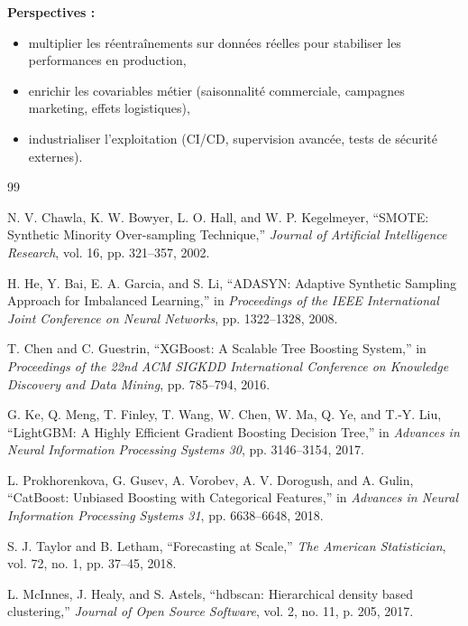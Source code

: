 \documentclass[12pt,a4paper]{report}
\begin{document}
\textbf{Perspectives :}
\begin{itemize}
  \item multiplier les r\'{e}entra\^{i}nements sur donn\'{e}es r\'{e}elles pour stabiliser les performances en production,
  \item enrichir les covariables m\'{e}tier (saisonnalit\'{e} commerciale, campagnes marketing, effets logistiques),
  \item industrialiser l'exploitation (CI/CD, supervision avanc\'{e}e, tests de s\'{e}curit\'{e} externes).
\end{itemize}


\begin{thebibliography}{99}

N. V. Chawla, K. W. Bowyer, L. O. Hall, and W. P. Kegelmeyer, ``SMOTE: Synthetic Minority Over-sampling Technique,'' \textit{Journal of Artificial Intelligence Research}, vol. 16, pp. 321--357, 2002.

H. He, Y. Bai, E. A. Garcia, and S. Li, ``ADASYN: Adaptive Synthetic Sampling Approach for Imbalanced Learning,'' in \textit{Proceedings of the IEEE International Joint Conference on Neural Networks}, pp. 1322--1328, 2008.

T. Chen and C. Guestrin, ``XGBoost: A Scalable Tree Boosting System,'' in \textit{Proceedings of the 22nd ACM SIGKDD International Conference on Knowledge Discovery and Data Mining}, pp. 785--794, 2016.

G. Ke, Q. Meng, T. Finley, T. Wang, W. Chen, W. Ma, Q. Ye, and T.-Y. Liu, ``LightGBM: A Highly Efficient Gradient Boosting Decision Tree,'' in \textit{Advances in Neural Information Processing Systems 30}, pp. 3146--3154, 2017.

L. Prokhorenkova, G. Gusev, A. Vorobev, A. V. Dorogush, and A. Gulin, ``CatBoost: Unbiased Boosting with Categorical Features,'' in \textit{Advances in Neural Information Processing Systems 31}, pp. 6638--6648, 2018.

S. J. Taylor and B. Letham, ``Forecasting at Scale,'' \textit{The American Statistician}, vol. 72, no. 1, pp. 37--45, 2018.

L. McInnes, J. Healy, and S. Astels, ``hdbscan: Hierarchical density based clustering,'' \textit{Journal of Open Source Software}, vol. 2, no. 11, p. 205, 2017.


\end{thebibliography}
\end{document}
